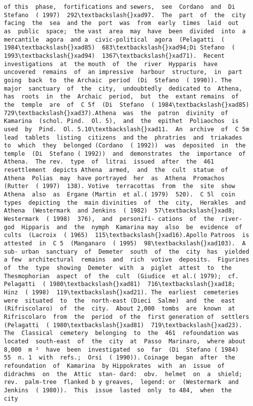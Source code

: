 \documentclass[11pt]{article}
\begin{document}
\begin{Verbatim}[commandchars=\\\{\}]
of this  phase,  fortifications and sewers,  see  Cordano  and  Di Stefano  ( 1997)  292\textbackslash{}xad97.  The  part  of  the  city  facing  the  sea  and the  port  was  from  early  times  laid  out  as  public  space;  the vast  area  may  have  been  divided  into  a  mercantile  agora  and a  civic-political  agora  (Pelagatti  ( 1984\textbackslash{}xad85)  683\textbackslash{}xad94;Di Stefano  ( 1993\textbackslash{}xad94)  1367\textbackslash{}xad71).  Recent  investigations  at  the mouth  of  the  river  Hypparis  have uncovered  remains  of  an impressive  harbour  structure,  in  part  going  back  to  the Archaic  period  (Di  Stefano  ( 1990)). The  major  sanctuary  of  the  city,  undoubtedly  dedicated to  Athena,  has  roots  in  the  Archaic  period,  but  the  extant remains  of  the  temple  are  of  C 5f  (Di  Stefano  ( 1984\textbackslash{}xad85) 729\textbackslash{}xad37).Athena  was  the  patron  divinity  of  Kamarina  (schol. Pind.  Ol. 5),  and  the  epithet  Poliaochos  is  used  by  Pind.  Ol. 5.10\textbackslash{}xad11.  An  archive  of  C 5m  lead  tablets  listing  citizens  and the  phratries  and  triakades  to  which  they  belonged (Cordano  ( 1992))  was  deposited  in  the  temple  (Di  Stefano ( 1992))  and  demonstrates  the  importance  of  Athena.  The rev.  type  of  litrai  issued  after  the  461  resettlement  depicts Athena  armed,  and  the  cult  statue  of  Athena  Polias  may  have portrayed  her  as  Athena  Promachos  (Rutter  ( 1997)  138). Votive  terracottas  from  the  site  show  Athena  also  as  Ergane (Martin  et al.( 1979)  520).  C 5l  coin  types  depicting  the  main divinities  of  the  city,  Herakles  and  Athena  (Westermark  and Jenkins  ( 1982)  57\textbackslash{}xad8;  Westermark  ( 1998)  376),  and  personifi- cations  of  the  river-god  Hipparis  and  the  nymph  Kamarina may  also  be  evidence  of  cults  (Lacroix  ( 1965)  115\textbackslash{}xad16).Apollo Patroos  is  attested  in  C 5  (Manganaro  ( 1995)  98\textbackslash{}xad103).  A  sub- urban  sanctuary  of  Demeter  south  of  the  city  has  yielded  a few  architectural  remains  and  rich  votive  deposits.  Figurines of  the  type  showing  Demeter  with  a  piglet  attest  to  the Thesmophorian  aspect  of  the  cult  (Giudice  et al.( 1979);  cf. Pelagatti  ( 1980\textbackslash{}xad81)  716\textbackslash{}xad18;  Hinz  ( 1998)  119\textbackslash{}xad21). The  earliest  cemeteries  were  situated  to  the  north-east (Dieci  Salme)  and  the  east  (Rifriscolaro)  of  the  city.  About 2,000  tombs  are  known  at  Rifriscolaro  from  the  period  of the  first generation of  settlers  (Pelagatti  ( 1980\textbackslash{}xad81)  719\textbackslash{}xad23). The  Classical  cemetery  belonging  to  the  461  refoundation was  located  south-east  of  the  city  at  Passo  Marinaro,  where about 8,000  m ²  have  been  investigated  so  far  (Di  Stefano ( 1984)  55  n. 1  with  refs.;  Orsi  ( 1990)). Coinage  began  after  the  refoundation  of  Kamarina  by Hippokrates  with  an  issue  of  didrachms  on  the  Attic  stan- dard:  obv.  helmet  on  a  shield;  rev.  palm-tree  flanked b y greaves,  legend: or  (Westermark  and  Jenkins  ( 1980)).  This  issue  lasted  only  to 484,  when  the  city  
\end{Verbatim}
\end{document}
